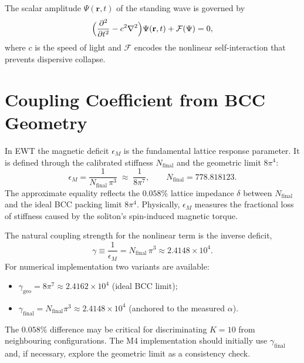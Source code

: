 \documentclass[11pt,a4paper]{article}
\begin{document}
	The scalar amplitude $\Psi(\mathbf{r},t)$ of the standing wave is
	governed by
	\begin{equation}\label{eq:soliton}
		\Bigl( \frac{\partial^{2}}{\partial t^{2}} - c^{2}\nabla^{2} \Bigr)
		\Psi(\mathbf{r},t) + \mathcal{F}(\Psi) = 0 ,
	\end{equation}
	where $c$ is the speed of light and $\mathcal{F}$ encodes the nonlinear
	self-interaction that prevents dispersive collapse.
	
	\section{Coupling Coefficient from BCC Geometry}
	
	In EWT the magnetic deficit $\epsilon_{M}$ is the fundamental lattice
	response parameter.  It is defined through the calibrated stiffness
	$N_{\text{final}}$ and the geometric limit $8\pi^{4}$:
	\begin{equation}\label{eq:epsM}
		\epsilon_{M} = \frac{1}{N_{\text{final}}\,\pi^{3}}
		\;\approx\; \frac{1}{8\pi^{7}}, \qquad
		N_{\text{final}} = 778.818123 .
	\end{equation}
	The approximate equality reflects the $0.058\%$ lattice impedance
	$\delta$ between $N_{\text{final}}$ and the ideal BCC packing limit
	$8\pi^{4}$.  Physically, $\epsilon_{M}$ measures the fractional loss of
	stiffness caused by the soliton's spin-induced magnetic torque.
	
	The natural coupling strength for the nonlinear term is the inverse
	deficit,
	\begin{equation}\label{eq:gamma}
		\gamma \equiv \frac{1}{\epsilon_{M}}
		= N_{\text{final}}\,\pi^{3} \approx 2.4148 \times 10^{4}.
	\end{equation}
	For numerical implementation two variants are available:
	\begin{itemize}
		\item $\gamma_{\text{geo}} = 8\pi^{7} \approx 2.4162 \times 10^{4}$
		(ideal BCC limit);
		\item $\gamma_{\text{final}} = N_{\text{final}}\pi^{3} \approx 2.4148
		\times 10^{4}$ (anchored to the measured $\alpha$).
	\end{itemize}
	The $0.058\%$ difference may be critical for discriminating $K=10$ from
	neighbouring configurations.  The M4 implementation should initially use
	$\gamma_{\text{final}}$ and, if necessary, explore the geometric limit
	as a consistency check.
	
\end{document}
